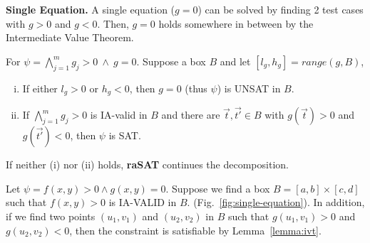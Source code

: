 \documentclass[runningheads,a4paper,oribibl]{llncs}
\newcommand{\suppress}[1]{} %
\begin{document}
\medskip \noindent 
\textbf{Single Equation.}
A single equation (${g=0}$) can be solved by finding 2 test cases with $g > 0$ and $g < 0$.
Then, $g=0$ holds somewhere in between by the Intermediate Value Theorem.

\begin{lemma} \label{lemma:ivt}
For $\psi =
\bigwedge \limits_{j=1}^m g_j > 0~\wedge~g = 0$.
Suppose a box
$B$
and
let ${[l_g, h_g] = range(g, B)}$, 
\begin{enumerate}[(i)]
\item If either $l_g > 0$ or $h_g < 0$, then $g = 0$ (thus $\psi$) is UNSAT in $B$. 
\item If $\bigwedge \limits_{j=1}^m g_j > 0$ is IA-valid in $B$ and there are $\vec{t},\vec{t'} \in B$
  with $g(\vec{t}) > 0$ and $g(\vec{t'}) < 0$, then $\psi$ is SAT.
\end{enumerate}
\end{lemma}

\suppress{
\begin{proof}
\begin{enumerate}[(i)]
\item If $l_g > 0$ or $h_g < 0$, then $g=0$ cannot be satisfied in box $I$.
  As a result, $F$ is UNSAT in $I$. 
\item If there are two instances $\vec{t},\vec{t'}$ in the box with
  $g(\vec{t}) > 0$ and $g(\vec{t'}) < 0$, it is clear from the Intermediate
  Value Theorem that there exist one point $\vec{t_0}$ between $\vec{t}$ and
  $\vec{t'}$ such that $g(\vec{t_0}) = 0$. In addition, because
  $\bigwedge \limits_{j}^m f_j > 0$ is IA-VALID in $I$, $\vec{t_0}$ also
  satisfies $\bigwedge \limits_{j}^m f_j > 0$.
  As a result, $F$ is satisfiable with $\vec{t_0}$ as the SAT instance.
\end{enumerate}
\end{proof}
}
If neither (i) nor (ii) holds, \textbf{raSAT} continues the decomposition.
\begin{example}
  Let $\psi = f(x, y) > 0 \wedge g(x, y) = 0$.
  Suppose we find a box 
  ${B = [a, b] \times [c, d]}$
  such that $f(x, y) > 0$ is IA-VALID in $B$.
  (Fig.~\ref{fig:single-equation}).
  In addition, 
  if we find two points $(u_1, v_1)$ and $(u_2, v_2)$ in $B$ such that
  $g(u_1, v_1) > 0$ and $g(u_2, v_2) < 0$,
  then the constraint is satisfiable by Lemma~\ref{lemma:ivt}. 
\end{example}
\end{document}
